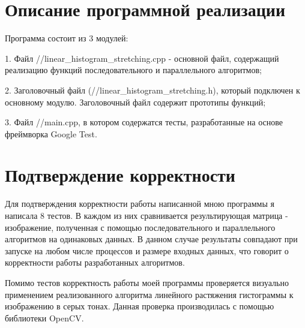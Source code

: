 \documentclass{report}
\begin{document}
\section*{Описание программной реализации}
Программа состоит из 3 модулей: 
\par 1. Файл //linear\_histogram\_stretching.cpp - основной файл, содержащий реализацию функций последовательного и параллельного алгоритмов; 
\par 2. Заголовочный файл (//linear\_histogram\_stretching.h), который подключен к основному модулю. Заголовочный файл содержит прототипы функций; 
\par 3. Файл //main.cpp, в котором содержатся тесты, разработанные на основе фреймворка Google Test.
\newpage

\section*{Подтверждение корректности}
Для подтверждения корректности работы написанной мною программы я написала 8 тестов. В каждом из них сравнивается результирующая матрица - изображение, полученная с помощью последовательного и параллельного алгоритмов на одинаковых данных. В данном случае результаты совпадают при запуске на любом числе процессов и размере входных данных, что говорит о корректности работы разработанных алгоритмов. 
\par Помимо тестов корректность работы моей программы проверяется визуально применением реализованного алгоритма линейного растяжения гистограммы к изображению в серых тонах. Данная проверка производилась с помощью библиотеки OpenCV.
\newpage

\end{document}
